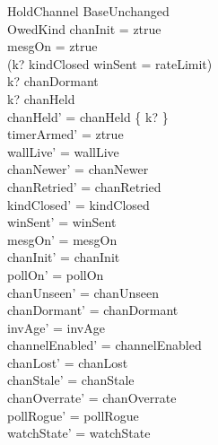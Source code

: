 \documentclass[a4paper,10pt,fleqn]{article}
\begin{document}
\begin{schema}{HoldChannel}
  BaseUnchanged \\
  OwedKind
  \where
  chanInit = ztrue \\
  mesgOn = ztrue \\
  (k? \in kindClosed \lor winSent = rateLimit) \\
  k? \notin chanDormant \\
  k? \notin chanHeld \\
  chanHeld' = chanHeld \cup \{ k? \} \\
  timerArmed' = ztrue \\
  wallLive' = wallLive \\
  chanNewer' = chanNewer \\
  chanRetried' = chanRetried \\
  kindClosed' = kindClosed \\
  winSent' = winSent \\
  mesgOn' = mesgOn \\
  chanInit' = chanInit \\
  pollOn' = pollOn \\
  chanUnseen' = chanUnseen \\
  chanDormant' = chanDormant \\
  invAge' = invAge \\
  channelEnabled' = channelEnabled \\
  chanLost' = chanLost \\
  chanStale' = chanStale \\
  chanOverrate' = chanOverrate \\
  pollRogue' = pollRogue \\
  watchState' = watchState
\end{schema}
\end{document}
